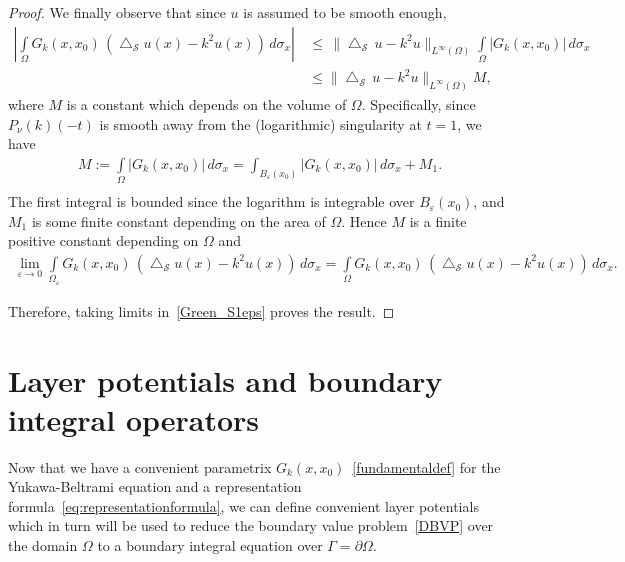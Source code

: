 \documentclass[final]{siamltex}
\newcommand{\lap}{\bigtriangleup}
\renewcommand{\S} {\mathcal{S}}
\begin{document}
\begin{proof}
We finally observe that since $u$ is assumed to be smooth enough,
\begin{align*} 
\left| \int\limits_{\Omega}
G_k(x,x_0)\,(\lap_{\S} u(x)-k^2u(x)) \, d\sigma_x\right|\,&\leq \,
\|\lap_{\S}\,u -k^2 u\|_{L^{\infty}(\Omega)} \int\limits_{\Omega}
|G_k(x,x_0)| \, d\sigma_x\,\\
& \leq \|\lap_{\S}\,u -k^2 u\|_{L^{\infty}(\Omega)}M,
\end{align*}
where $M$ is a constant which depends on the volume of $\Omega$.
Specifically, since $P_\nu(k)(-t)$ is smooth away from the
(logarithmic) singularity at $t=1$, we have 
\begin{align*}
M:=\int\limits_{\Omega} |G_k(x,x_0)| \, d\sigma_x=\int_{B_{\varepsilon}(x_0)}|G_k(x,x_0)| \, d\sigma_x + M_1. \\
\end{align*}
The first integral is bounded since the logarithm is integrable over
${B_{\varepsilon}(x_0)}$, and $M_1$ is some finite constant depending
on the area of $\Omega$. Hence $M$ is a finite positive
constant depending on $\Omega$ and
\begin{align*}
  \lim_{\varepsilon\rightarrow 0}
  \int\limits_{\Omega_{\varepsilon}} G_k(x,x_0)\,(\lap_{\S} u(x)
  -k^2u(x)) \,d\sigma_x = \int\limits_{\Omega} G_k(x,x_0)\,
  (\lap_{\S} u(x) -k^2u(x))\,d\sigma_x.
\end{align*}

Therefore, taking limits in~\eqref{Green_S1eps} proves the result.
\end{proof}

\section{Layer potentials and boundary integral operators}
Now that we have a convenient parametrix
$G_k(x,x_0)$~\eqref{fundamentaldef} for the Yukawa-Beltrami equation
and a representation formula~\eqref{eq:representationformula}, we can
define convenient layer potentials which in turn will be used to reduce
the boundary value problem~\eqref{DBVP}  over the domain $\Omega$ to a
boundary integral equation over $\Gamma = \partial \Omega$.


\end{document}
